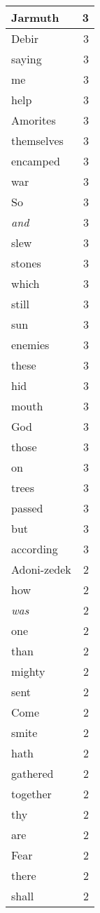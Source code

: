 \begin{center}
\begin{longtable}{l|r}
Jarmuth & 3 \\ \hline
Debir & 3 \\ \hline
saying & 3 \\ \hline
me & 3 \\ \hline
help & 3 \\ \hline
Amorites & 3 \\ \hline
themselves & 3 \\ \hline
encamped & 3 \\ \hline
war & 3 \\ \hline
So & 3 \\ \hline
\emph{and} & 3 \\ \hline
slew & 3 \\ \hline
stones & 3 \\ \hline
which & 3 \\ \hline
still & 3 \\ \hline
sun & 3 \\ \hline
enemies & 3 \\ \hline
these & 3 \\ \hline
hid & 3 \\ \hline
mouth & 3 \\ \hline
God & 3 \\ \hline
those & 3 \\ \hline
on & 3 \\ \hline
trees & 3 \\ \hline
passed & 3 \\ \hline
but & 3 \\ \hline
according & 3 \\ \hline
Adoni-zedek & 2 \\ \hline
how & 2 \\ \hline
\emph{was} & 2 \\ \hline
one & 2 \\ \hline
than & 2 \\ \hline
mighty & 2 \\ \hline
sent & 2 \\ \hline
Come & 2 \\ \hline
smite & 2 \\ \hline
hath & 2 \\ \hline
gathered & 2 \\ \hline
together & 2 \\ \hline
thy & 2 \\ \hline
are & 2 \\ \hline
Fear & 2 \\ \hline
there & 2 \\ \hline
shall & 2 \\ \hline

\end{longtable}
\end{center}
